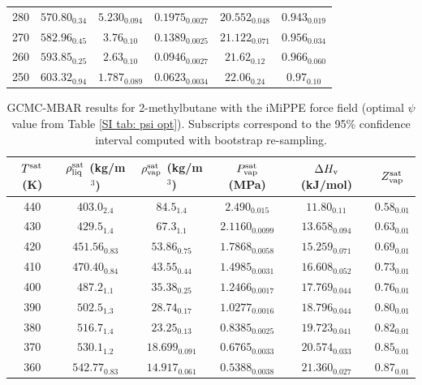 \documentclass[journal=jctc,manuscript=article]{achemso}
\begin{document}
\begin{table}[htb!]
\begin{center}
\begin{tabular}{|c|c|c|c|c|c|}
			280 & $570.80_{0.34}$ & $5.230_{0.094}$ & $0.1975_{0.0027}$ & $20.552_{0.048}$ & $0.943_{0.019}$ \\
			270 & $582.96_{0.45}$ & $3.76_{0.10}$ & $0.1389_{0.0025}$ & $21.122_{0.071}$ & $0.956_{0.034}$ \\
			260 & $593.85_{0.25}$ & $2.63_{0.10}$ & $0.0946_{0.0027}$ & $21.62_{0.12}$ & $0.966_{0.060}$ \\
			250 & $603.32_{0.94}$ & $1.787_{0.089}$ & $0.0623_{0.0034}$ & $22.06_{0.24}$ & $0.97_{0.10}$ \\
			\hline
		\end{tabular}
	\end{center}
\end{table}

\begin{table}[htb!]
	\caption{GCMC-MBAR results for 2-methylbutane with the iMiPPE force field (optimal $\psi$ value from Table \ref{SI tab: psi opt}). Subscripts correspond to the 95\% confidence interval computed with bootstrap re-sampling.}
	\begin{center}
		\begin{tabular}{|c|c|c|c|c|c|}
			\hline
			$T^{\rm sat}$ (K) & $\rho_{\rm liq}^{\rm sat}$ (kg/m$^3$) & $\rho_{\rm vap}^{\rm sat}$ (kg/m$^3$) & $P_{\rm vap}^{\rm sat}$ (MPa) & $\Delta H_{\rm v}$ (kJ/mol) & $Z_{\rm vap}^{\rm sat}$ \\ \hline
			440 & $403.0_{2.4}$ & $84.5_{1.4}$ & $2.490_{0.015}$ & $11.80_{0.11}$ & $0.58_{0.01}$ \\
			430 & $429.5_{1.4}$ & $67.3_{1.1}$ & $2.1160_{0.0099}$ & $13.658_{0.094}$ & $0.63_{0.01}$ \\
			420 & $451.56_{0.83}$ & $53.86_{0.75}$ & $1.7868_{0.0058}$ & $15.259_{0.071}$ & $0.69_{0.01}$ \\
			410 & $470.40_{0.84}$ & $43.55_{0.44}$ & $1.4985_{0.0031}$ & $16.608_{0.052}$ & $0.73_{0.01}$ \\
			400 & $487.2_{1.1}$ & $35.38_{0.25}$ & $1.2466_{0.0017}$ & $17.769_{0.044}$ & $0.76_{0.01}$ \\
			390 & $502.5_{1.3}$ & $28.74_{0.17}$ & $1.0277_{0.0016}$ & $18.796_{0.044}$ & $0.80_{0.01}$ \\
			380 & $516.7_{1.4}$ & $23.25_{0.13}$ & $0.8385_{0.0025}$ & $19.723_{0.041}$ & $0.82_{0.01}$ \\
			370 & $530.1_{1.2}$ & $18.699_{0.091}$ & $0.6765_{0.0033}$ & $20.574_{0.033}$ & $0.85_{0.01}$ \\
			360 & $542.77_{0.83}$ & $14.917_{0.061}$ & $0.5388_{0.0038}$ & $21.360_{0.027}$ & $0.87_{0.01}$ \\

\end{tabular}
\end{center}
\end{table}
\end{document}
